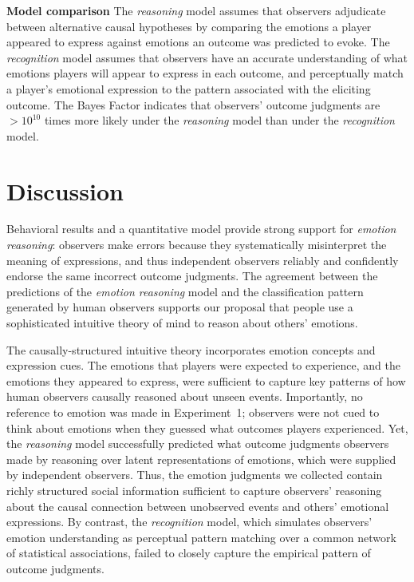 \documentclass[10pt,letterpaper]{article}
\begin{document}
\vspace{1 mm}
\noindent\textbf{Model comparison}
The {\em reasoning} model assumes that observers adjudicate between alternative causal hypotheses by comparing the emotions a player appeared to express against emotions an outcome was predicted to evoke. The {\em recognition} model assumes that observers have an accurate understanding of what emotions players will appear to express in each outcome, and perceptually match a player's emotional expression to the pattern associated with the eliciting outcome.
The Bayes Factor indicates that observers' outcome judgments are %
$>10^{10}$ times more likely under the {\em reasoning} model than under the {\em recognition} model.



\section{Discussion}

Behavioral results and a quantitative model provide strong support for {\em emotion reasoning}: observers make errors because they systematically misinterpret the meaning of expressions, and thus independent observers reliably and confidently endorse the same incorrect outcome judgments.
The agreement between the predictions of the {\em emotion reasoning} model and the classification pattern generated by human observers supports our proposal that people use a sophisticated intuitive theory of mind to reason about others' emotions. 

The causally-structured intuitive theory incorporates emotion concepts and expression cues. The emotions that players were expected to experience, and the emotions they appeared to express, were sufficient to capture key patterns of how human observers causally reasoned about unseen events. Importantly, no reference to emotion was made in Experiment~1; %
observers were not cued to think about emotions when they guessed what outcomes players experienced. Yet, the {\em reasoning} model successfully predicted what outcome judgments observers made by reasoning over latent representations of emotions, which were supplied by independent observers. %
Thus, the %
emotion judgments we collected contain richly structured social information sufficient to capture observers' reasoning about the causal connection between unobserved events and others' emotional expressions. By contrast, the {\em recognition} model, which simulates observers' emotion understanding as perceptual pattern matching over a common network of statistical associations, failed to closely capture the empirical pattern of outcome judgments.
\end{document}
